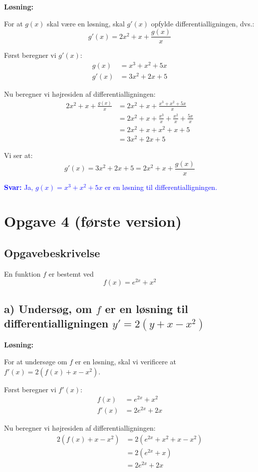 \documentclass[a4paper,12pt]{article}
\begin{document}
\textbf{Løsning:}

For at $g(x)$ skal være en løsning, skal $g'(x)$ opfylde differentialligningen, dvs.:
\[
g'(x) = 2x^2 + x + \frac{g(x)}{x}
\]

Først beregner vi $g'(x)$:
\begin{align*}
g(x) &= x^3 + x^2 + 5x \\
g'(x) &= 3x^2 + 2x + 5
\end{align*}

Nu beregner vi højresiden af differentialligningen:
\begin{align*}
2x^2 + x + \frac{g(x)}{x} &= 2x^2 + x + \frac{x^3 + x^2 + 5x}{x} \\
&= 2x^2 + x + \frac{x^3}{x} + \frac{x^2}{x} + \frac{5x}{x} \\
&= 2x^2 + x + x^2 + x + 5 \\
&= 3x^2 + 2x + 5
\end{align*}

Vi ser at:
\[
g'(x) = 3x^2 + 2x + 5 = 2x^2 + x + \frac{g(x)}{x}
\]

\textcolor{blue}{\textbf{Svar:} Ja, $g(x) = x^3 + x^2 + 5x$ er en løsning til differentialligningen.}

\newpage

\section*{Opgave 4 (første version)}

\subsection*{Opgavebeskrivelse}
En funktion $f$ er bestemt ved
\[
f(x) = e^{2x} + x^2
\]

\subsection*{a) Undersøg, om $f$ er en løsning til differentialligningen $y' = 2(y + x - x^2)$}

\textbf{Løsning:}

For at undersøge om $f$ er en løsning, skal vi verificere at $f'(x) = 2(f(x) + x - x^2)$.

Først beregner vi $f'(x)$:
\begin{align*}
f(x) &= e^{2x} + x^2 \\
f'(x) &= 2e^{2x} + 2x
\end{align*}

Nu beregner vi højresiden af differentialligningen:
\begin{align*}
2(f(x) + x - x^2) &= 2(e^{2x} + x^2 + x - x^2) \\
&= 2(e^{2x} + x) \\
&= 2e^{2x} + 2x
\end{align*}
\end{document}
